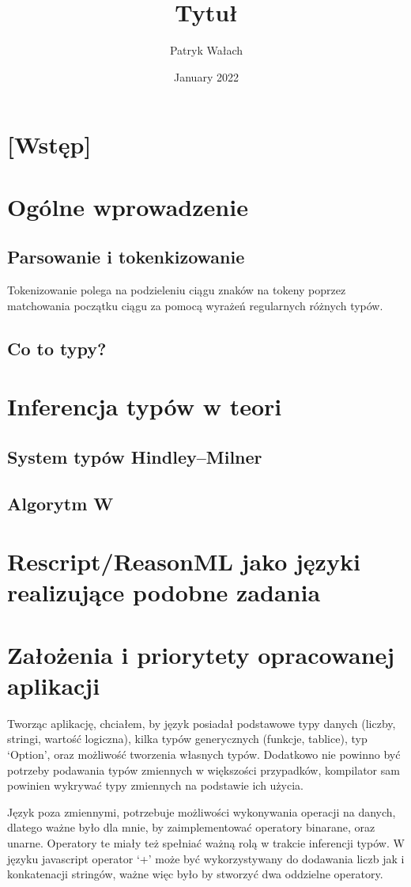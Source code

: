 \documentclass{article}
\title{Tytuł}
\author{Patryk Wałach}
\date{January 2022}
\begin{document}
\maketitle

\section{[Wstęp]}

\section{Ogólne wprowadzenie}
\subsection{Parsowanie i tokenkizowanie}
Tokenizowanie polega na podzieleniu ciągu znaków na tokeny poprzez matchowania początku ciągu za pomocą wyrażeń regularnych różnych typów.
\subsection{Co to typy?}
\section{Inferencja typów w teori}
\subsection{System typów Hindley–Milner}
\subsection{Algorytm W}
\section{Rescript/ReasonML jako języki realizujące podobne zadania}
\newpage
\section{Założenia i priorytety opracowanej aplikacji}
Tworząc aplikację, chciałem, by język posiadał podstawowe typy danych (liczby, stringi, wartość logiczna), kilka typów generycznych (funkcje, tablice), typ `Option', oraz możliwość tworzenia własnych typów.
Dodatkowo nie powinno być potrzeby podawania typów zmiennych w większości przypadków, kompilator sam powinien wykrywać typy zmiennych na podstawie ich użycia.


Język poza zmiennymi, potrzebuje możliwości wykonywania operacji na danych, dlatego ważne było dla mnie, by zaimplementować operatory binarane, oraz unarne. Operatory te miały też spełniać ważną rolą w trakcie inferencji typów. W języku javascript operator `+' może być wykorzystywany do dodawania liczb jak i konkatenacji stringów, ważne więc było by stworzyć dwa oddzielne operatory.
\end{document}
